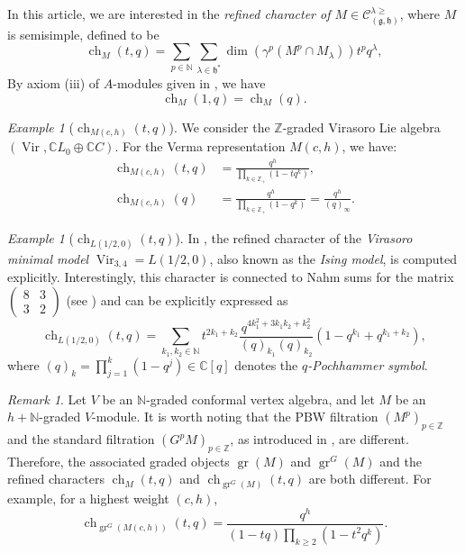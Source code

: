 \documentclass[a4paper, 12pt, reqno]{amsart}
\theoremstyle{remark}
\newtheorem{remark}[theorem]{Remark}
\newtheorem{example}[theorem]{Example}
\DeclareMathOperator{\Vir}{Vir}
\DeclareMathOperator{\ch}{ch}
\DeclareMathOperator{\gr}{gr}
\begin{document}
In this article, we are interested in the \emph{refined character of $M \in \mathcal{C}^{\lambda \ge}_{(\mathfrak{g}, \mathfrak{h})}$}, where $M$ is semisimple, defined to be
\begin{equation*}
  \ch_M(t, q) = \sum_{p \in \mathbb{N}}\sum_{\lambda \in \mathfrak{h}^*}\dim(\gamma^p(M^p \cap M_{\lambda}))t^pq^{\lambda},
\end{equation*}
By axiom (iii) of $A$-modules given in , we have
\begin{equation*}
  \ch_M(1, q) = \ch_M(q).
\end{equation*}

\begin{example}[$\ch_{M(c, h)}(t, q)$]
  \label{exa:5}
  We consider the $\mathbb{Z}$-graded Virasoro Lie algebra $(\Vir, \mathbb{C}L_0 \oplus \mathbb{C}C)$.
  For the Verma representation $M(c, h)$, we have:
  \begin{align*}
    \ch_{M(c, h)}(t, q) &= \frac{q^h}{\prod_{k \in \mathbb{Z}_+}(1 - tq^k)}, \\
    \ch_{M(c, h)}(q) &= \frac{q^h}{\prod_{k \in \mathbb{Z}_+}(1 - q^k)} = \frac{q^h}{(q)_{\infty}}.
  \end{align*}
\end{example}

\begin{example}[$\ch_{L(1/2, 0)}(t, q)$]
  \label{exa:6}
  In \cite{andrews_singular_2022}, the refined character of the \emph{Virasoro minimal model} $\Vir_{3, 4} = L(1/2, 0)$, also known as the \emph{Ising model}, is computed explicitly.
  Interestingly, this character is connected to Nahm sums for the matrix $\left(\begin{smallmatrix} 8 & 3 \\ 3 & 2 \end{smallmatrix}\right)$ (see \cite{Nahm2007}) and can be explicitly expressed as
  \begin{equation*}
    \ch_{L(1/2, 0)}(t, q) = \sum_{k_1, k_2 \in \mathbb{N}}t^{2k_1 + k_2}\frac{q^{4k_1^2 + 3k_1k_2 + k_2^2}}{(q)_{k_1}(q)_{k_2}}(1 - q^{k_1} + q^{k_1 + k_2}),
  \end{equation*}
  where $(q)_k = \prod_{j = 1}^k(1 - q^j) \in \mathbb{C}[q]$ denotes the \emph{$q$-Pochhammer symbol}.
\end{example}

\begin{remark}
  \label{rmk:3}
  Let $V$ be an $\mathbb{N}$-graded conformal vertex algebra, and let $M$ be an $h + \mathbb{N}$-graded $V$-module.
  It is worth noting that the PBW filtration $(M^p)_{p \in \mathbb{Z}}$ and the standard filtration $(G^pM)_{p \in \mathbb{Z}}$, as introduced in \cite{salazar_pbw_2024}, are different.
  Therefore, the associated graded objects $\gr(M)$ and $\gr^G(M)$ and the refined characters $\ch_M(t, q)$ and $\ch_{\gr^G(M)}(t, q)$ are both different.
  For example, for a highest weight $(c, h)$,
  \begin{equation*}
    \ch_{\gr^G(M(c, h))}(t, q) = \frac{q^h}{(1 - tq)\prod_{k \ge 2}(1 - t^2q^k)}.
  \end{equation*}
\end{remark}
\end{document}
